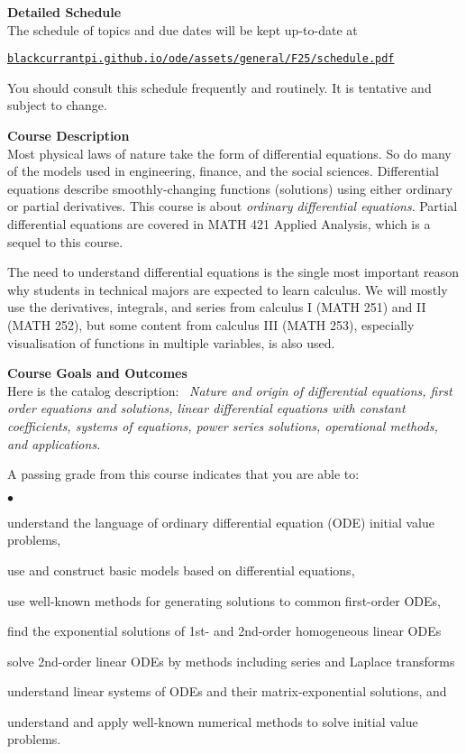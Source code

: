 \documentclass[12pt]{article}
\renewcommand{\emph}[1]{\textsf{\textbf{#1}}}
\newcommand{\localhead}[1]{\par\smallskip\textbf{#1}\nobreak\\}%
\def\heading#1{\localhead{\large\emph{#1}}}
\newenvironment{clist}%
{\bgroup\parskip 0pt\begin{list}{$\bullet$}{\partopsep 4pt\topsep 0pt\itemsep -2pt}}%
{\end{list}\egroup}%
\begin{document}
\cfoot{\thepage}

\heading{Detailed Schedule}
The schedule of topics and due dates will be kept up-to-date at

\smallskip
\centerline{\href{https://blackcurrantpi.github.io/ode/assets/general/F25/schedule.pdf}{\tt blackcurrantpi.github.io/ode/assets/general/F25/schedule.pdf}}

You should consult this schedule frequently and routinely.  It is tentative and subject to change.


\medskip
\heading{Course Description}
Most physical laws of nature take the form of differential equations.  So do many of the models used in engineering, finance, and the social sciences.  Differential equations describe smoothly-changing functions (solutions) using either ordinary or partial derivatives.  This course is about \textsl{ordinary differential equations}.  Partial differential equations are covered in MATH 421 Applied Analysis, which is a sequel to this course.

The need to understand differential equations is the single most important reason why students in technical majors are expected to learn calculus.  We will mostly use the derivatives, integrals, and series from calculus I (MATH 251) and II (MATH 252), but some content from calculus III (MATH 253), especially visualisation of functions in multiple variables, is also used.


\bigskip\bigskip
\heading{Course Goals and Outcomes}
Here is the catalog description: \, \textsl{Nature and origin of differential equations, first order equations and solutions, linear differential equations with constant coefficients, systems of equations, power series solutions, operational methods, and applications.}

A passing grade from this course indicates that you are able to:

\begin{clist}
\item understand the language of ordinary differential equation (ODE) initial value problems,
\item use and construct basic models based on differential equations,
\item use well-known methods for generating solutions to common first-order ODEs,
\item find the exponential solutions of 1st- and 2nd-order homogeneous linear ODEs
\item solve 2nd-order linear ODEs by methods including series and Laplace transforms
\item understand linear systems of ODEs and their matrix-exponential solutions, and
\item understand and apply well-known numerical methods to solve initial value problems.
\end{clist}
\end{document}
